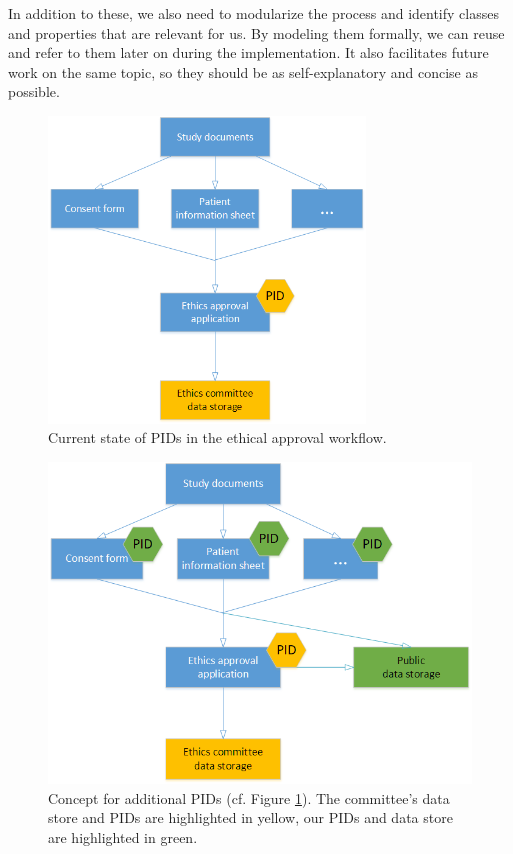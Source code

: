 \documentclass[10pt]{article}
\begin{document}
In addition to these, we also need to modularize the process and identify classes and properties that are relevant for us. By modeling them formally, we can reuse and refer to them later on during the implementation. It also facilitates future work on the same topic, so they should be as self-explanatory and concise as possible.
\begin{figure}
\centering
	\includegraphics[width=0.75\textwidth]{img/pids_currentstate.png}
	\caption{Current state of PIDs in the ethical approval workflow.}
	\label{pidsnow}
\end{figure}	
\begin{figure}
\centering
	\includegraphics[width=1\textwidth]{img/pids_proposal.png}
	\caption{Concept for additional PIDs (cf. Figure \ref{pidsnow}). The committee's data store and PIDs are highlighted in yellow, our PIDs and data store are highlighted in green.}
	\label{pidsfuture}
\end{figure}
\end{document}
